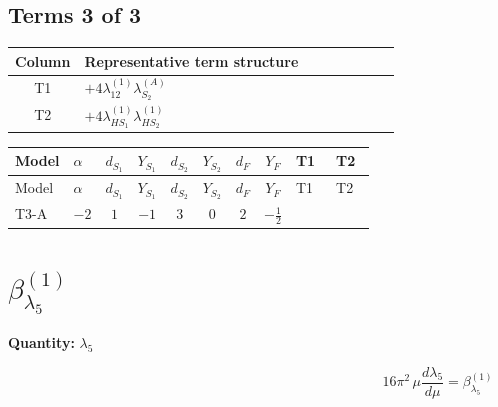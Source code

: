 \documentclass[8pt]{article}
\begin{document}
\begin{landscape}
\subsection*{Terms 3 of 3}
\begin{center}
\begin{tabular}{@{}c >{\raggedright\arraybackslash}p{0.82\linewidth}@{}}
\toprule
Column & Representative term structure \\
\midrule
T1 & \(\displaystyle +4 {\lambda_{12}^{(1)}} {\lambda_{S_2}^{(A)}}\) \\
\midrule
T2 & \(\displaystyle +4 {\lambda_{HS_1}^{(1)}} {\lambda_{HS_2}^{(1)}}\) \\
\midrule
\bottomrule
\end{tabular}
\end{center}
\smallskip
\tiny
\begin{longtable}{@{}llcccccc >{\raggedright\arraybackslash}p{0.21\linewidth} >{\raggedright\arraybackslash}p{0.21\linewidth}@{}}
\toprule
Model & $\alpha$ & $d_{S_1}$ & $Y_{S_1}$ & $d_{S_2}$ & $Y_{S_2}$ & $d_F$ & $Y_F$ & T1 & T2 \\
\midrule
\endfirsthead
\toprule
Model & $\alpha$ & $d_{S_1}$ & $Y_{S_1}$ & $d_{S_2}$ & $Y_{S_2}$ & $d_F$ & $Y_F$ & T1 & T2 \\
\midrule
\endhead
T3-A & $-2$ & $1$ & $-1$ & $3$ & $0$ & $2$ & $-\frac{1}{2}$ & \scriptsize\adjustbox{max width=\linewidth}{$\begin{gathered} +4 {\lambda_{12}^{(1)}} {\lambda_{S_2}^{(A)}}\end{gathered}$} & \scriptsize\adjustbox{max width=\linewidth}{$\begin{gathered} +4 {\lambda_{HS_1}^{(1)}} {\lambda_{HS_2}^{(1)}}\end{gathered}$} \\
\midrule
\bottomrule
\end{longtable}
\clearpage
\section*{$\beta_{\lambda_5}^{(1)}$}
\noindent\textbf{Quantity: }$\lambda_5$\par\smallskip
\[16\pi^2\,\mu\frac{d \lambda_5}{d\mu}=\beta_{\lambda_5}^{(1)}\]

\end{landscape}
\end{document}
